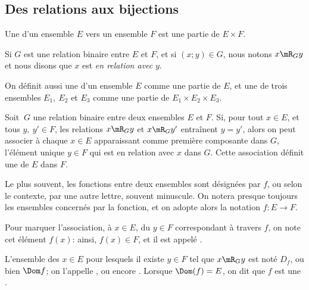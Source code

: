 \subsection{Des relations aux bijections}
\label{SUBooRelFctBijections}

\begin{definition}        \label{DEFooRFVTooUUuFuE}
	Une  d'un ensemble \( E\) vers un ensemble \( F\) est une partie de \( E\times F\).

	Si \( G\) est une relation binaire entre \( E\) et \( F\), et si \( (x; y) \in G \), nous notons \( x\mR_G y\) et nous disons que \( x\) est \emph{en relation avec} \( y\).

	On définit aussi une  d'un ensemble \( E \) comme une partie de \( E \), et une  de trois ensembles \( E_1,\ E_2 \) et \( E_3 \) comme une partie de \( E_1 \times E_2 \times E_3 \).
\end{definition}

\begin{definition}\label{DefooApplicFct}
	Soit \(\ G\) une relation binaire entre deux ensembles \(E\) et \( F\). Si, pour tout \(x \in E\), et tous \(y,\ y' \in F\), les relations \(x\mR_G y\) et \(x\mR_G y'\) entraînent \( y = y'\), alors on peut associer à chaque \( x \in E\) apparaissant comme première composante dans \( G \), l'élément unique \(y \in F\) qui est en relation avec \(x\) dans \(G\). Cette association définit une  de \(E\) dans \(F\).

	Le plus souvent, les fonctions entre deux ensembles sont désignées par \(f \), ou selon le contexte, par une autre lettre, souvent minuscule. On notera presque toujours les ensembles concernés par la fonction, et on adopte alors la notation \( f: E \to F \).

	Pour marquer l'association, à \(x \in E \), du \(y \in F\) correspondant à travers \( f \), on note cet élément \( f(x) \): ainsi, \( f(x) \in F \), et il est appelé .

	L'ensemble des \( x \in E \) pour lesquels il existe \( y \in F\) tel que \(x\mR_G y\) est noté \(D_f \), ou bien \( \Dom f \); on l'appelle  , ou encore . Lorsque \(\Dom(f) = E\), on dit que \( f \) est une .
\end{definition}

